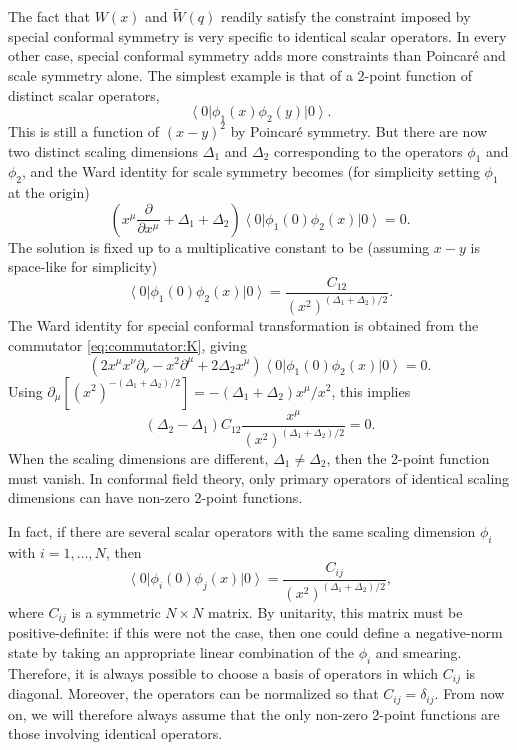 \documentclass[a4paper,12pt]{article}
\newcommand{\ket}[1]{\left| #1 \right\rangle}
\newcommand{\bra}[1]{\left\langle #1 \right|}
\numberwithin{equation}{section}
\begin{document}
The fact that $W(x)$ and $\widetilde{W}(q)$ readily satisfy the constraint imposed by special conformal symmetry is very specific to identical scalar operators. In every other case, special conformal symmetry adds more constraints than Poincaré and scale symmetry alone.
The simplest example is that of a 2-point function of distinct scalar operators,
\begin{equation}
	\bra{0} \phi_1(x) \phi_2(y) \ket{0}.
\end{equation}
This is still a function of $(x-y)^2$ by Poincaré symmetry. But there are now two distinct scaling dimensions $\Delta_1$ and $\Delta_2$ corresponding to the operators $\phi_1$ and $\phi_2$, and the Ward identity for scale symmetry becomes (for simplicity setting $\phi_1$ at the origin)
\begin{equation}
	\left( x^\mu \frac{\partial}{\partial x^\mu}
	+ \Delta_1 + \Delta_2 \right)
	\bra{0} \phi_1(0) \phi_2(x) \ket{0} = 0.
\end{equation}
The solution is fixed up to a multiplicative constant to be
(assuming $x - y$ is space-like for simplicity)
\begin{equation}
	\bra{0} \phi_1(0) \phi_2(x) \ket{0}
	= \frac{C_{12}}{(x^2)^{(\Delta_1 + \Delta_2)/2}}.
\end{equation}
The Ward identity for special conformal transformation is obtained from the commutator \eqref{eq:commutator:K}, giving
\begin{equation}
	\left( 2 x^\mu x^\nu \partial_\nu - x^2 \partial^\mu 
	+ 2 \Delta_2 x^\mu \right)
	\bra{0} \phi_1(0) \phi_2(x) \ket{0}
	= 0.
\end{equation}
Using $\partial_\mu \left[ (x^2)^{-(\Delta_1 + \Delta_2)/2} \right] = -(\Delta_1 + \Delta_2) x^\mu / x^2$, this implies
\begin{equation}
	\left( \Delta_2 - \Delta_1 \right) C_{12} 
	\frac{x^\mu}{(x^2)^{(\Delta_1 + \Delta_2)/2}} = 0.
\end{equation}
When the scaling dimensions are different, $\Delta_1 \neq \Delta_2$, then the 2-point function must vanish. In conformal field theory, only primary operators of identical scaling dimensions can have non-zero 2-point functions.

In fact, if there are several scalar operators with the same scaling dimension $\phi_i$ with $i = 1, \ldots, N$, then 
\begin{equation}
	\bra{0} \phi_i(0) \phi_j(x) \ket{0}
	= \frac{C_{ij}}{(x^2)^{(\Delta_1 + \Delta_2)/2}},
\end{equation}
where $C_{ij}$ is a symmetric $N \times N$ matrix. By unitarity, this matrix must be positive-definite: if this were not the case, then one could define a negative-norm state by taking an appropriate linear combination of the $\phi_i$ and smearing. Therefore, it is always possible to choose a basis of operators in which $C_{ij}$ is diagonal. Moreover, the operators can be normalized so that $C_{ij} = \delta_{ij}$. From now on, we will therefore always assume that the only non-zero 2-point functions are those involving identical operators.
\end{document}
